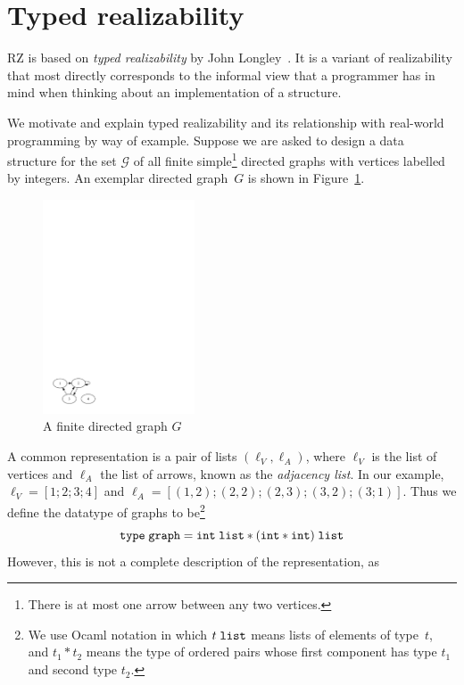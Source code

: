 \section{Typed realizability}
\label{sec:typed-realizability}

RZ is based on \emph{typed realizability} by John
Longley~\cite{Longley99}. It is a variant of realizability that most
directly corresponds to the informal view that a programmer has in
mind when thinking about an implementation of a structure.

We motivate and explain typed realizability and its relationship with
real-world programming by way of example. Suppose we are asked to
design a data structure for the set $\mathcal{G}$ of all finite
simple\footnote{There is at most one arrow between any two vertices.}
directed graphs with vertices labelled by integers. An exemplar
directed graph~$G$ is shown in Figure~\ref{fig:digraph}.
%
\begin{figure}
  \centering
  \includegraphics[width=0.4\textwidth]{digraph}
  \caption{A finite directed graph $G$}
  \label{fig:digraph}
\end{figure}
%
A common representation is a pair of lists $(\ell_V, \ell_A)$, where
$\ell_V$ is the list of vertices and $\ell_A$ the list of arrows,
known as the \emph{adjacency list}. In our example, $\ell_V = [1; 2;
3; 4]$ and $\ell_A = [(1,2); (2,2); (2,3); (3,2); (3;1)]$. Thus we
define the datatype of graphs to be\footnote{We use Ocaml notation in
  which $t\;\mathtt{list}$ means lists of elements of type~$t$, and
  $t_1 * t_2$ means the type of ordered pairs whose first component
  has type $t_1$ and second type $t_2$.}
%
\begin{equation*}
  \mathtt{type}\; \mathtt{graph} = \mathtt{int}\;\mathtt{list} * (\mathtt{int} * \mathtt{int})\;\mathtt{list}
\end{equation*}
%
However, this is not a complete description of the representation, as
